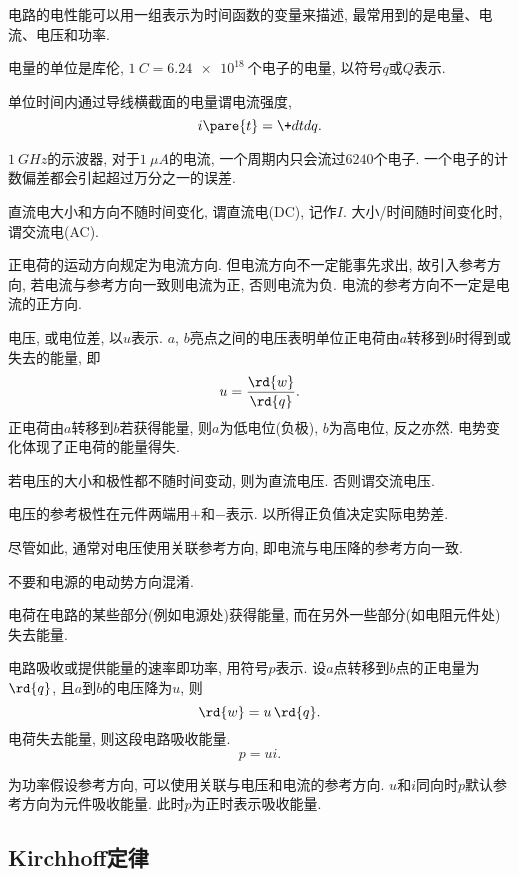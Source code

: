 \documentclass{ctexart}
\begin{document}
电路的电性能可以用一组表示为时间函数的变量来描述, 最常用到的是电量、电流、电压和功率.
\par
电量的单位是库伦, $\SI{1}{C} = \SI{6.24e18}{}$个电子的电量, 以符号$q$或$Q$表示.
\par
单位时间内通过导线横截面的电量谓电流强度,
\[ i\pare{t} = \+dtdq. \]
\begin{remark}
    $\SI{1}{GHz}$的示波器, 对于$\SI{1}{\mu A}$的电流, 一个周期内只会流过$6240$个电子. 一个电子的计数偏差都会引起超过万分之一的误差.
\end{remark}
直流电大小和方向不随时间变化, 谓直流电(DC), 记作$I$. 大小/时间随时间变化时, 谓交流电(AC).
\par
正电荷的运动方向规定为电流方向. 但电流方向不一定能事先求出, 故引入参考方向, 若电流与参考方向一致则电流为正, 否则电流为负. {\color{red}电流的参考方向不一定是电流的正方向.}
\par
电压, 或电位差, 以$u$表示. $a$, $b$亮点之间的电压表明单位正电荷由$a$转移到$b$时得到或失去的能量, 即
\[ u = \frac{\rd{w}}{\rd{q}}. \]
正电荷由$a$转移到$b$若获得能量, 则$a$为低电位(负极), $b$为高电位, 反之亦然. 电势变化体现了正电荷的能量得失.
\par
若电压的大小和极性都不随时间变动, 则为直流电压. 否则谓交流电压.
\par
电压的参考极性在元件两端用$+$和$-$表示. 以所得正负值决定实际电势差.
\par
尽管如此, 通常对电压使用关联参考方向, 即电流与电压降的参考方向一致.
\begin{pitfall}
    不要和电源的电动势方向混淆.
\end{pitfall}
电荷在电路的某些部分(例如电源处)获得能量, 而在另外一些部分(如电阻元件处)失去能量.
\par
电路吸收或提供能量的速率即功率, 用符号$p$表示. 设$a$点转移到$b$点的正电量为$\rd{q}$, 且$a$到$b$的电压降为$u$, 则
\[ \rd{w} = u\,\rd{q}. \]
电荷失去能量, 则这段电路吸收能量.
\[ p = ui. \]
\par
为功率假设参考方向, 可以使用关联与电压和电流的参考方向. $u$和$i$同向时$p$默认参考方向为元件吸收能量. 此时$p$为正时表示吸收能量.


\subsection{Kirchhoff定律} %
\label{sub:kirchhoff定律}
\end{document}
